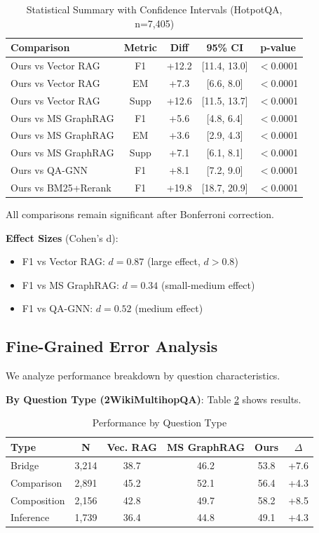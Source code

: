 \documentclass[conference]{IEEEtran}
\begin{document}
\begin{table}[htbp]
\caption{Statistical Summary with Confidence Intervals (HotpotQA, n=7,405)}
\label{tab:statistical}
\centering
\footnotesize
\begin{tabular}{lcccc}
\toprule
\textbf{Comparison} & \textbf{Metric} & \textbf{Diff} & \textbf{95\% CI} & \textbf{p-value} \\
\midrule
Ours vs Vector RAG & F1 & +12.2 & [11.4, 13.0] & $<$0.0001 \\
Ours vs Vector RAG & EM & +7.3 & [6.6, 8.0] & $<$0.0001 \\
Ours vs Vector RAG & Supp & +12.6 & [11.5, 13.7] & $<$0.0001 \\
Ours vs MS GraphRAG & F1 & +5.6 & [4.8, 6.4] & $<$0.0001 \\
Ours vs MS GraphRAG & EM & +3.6 & [2.9, 4.3] & $<$0.0001 \\
Ours vs MS GraphRAG & Supp & +7.1 & [6.1, 8.1] & $<$0.0001 \\
Ours vs QA-GNN & F1 & +8.1 & [7.2, 9.0] & $<$0.0001 \\
Ours vs BM25+Rerank & F1 & +19.8 & [18.7, 20.9] & $<$0.0001 \\
\bottomrule
\end{tabular}
\end{table}

All comparisons remain significant after Bonferroni correction.

\textbf{Effect Sizes} (Cohen's d):
\begin{itemize}
    \item F1 vs Vector RAG: $d = 0.87$ (large effect, $d > 0.8$)
    \item F1 vs MS GraphRAG: $d = 0.34$ (small-medium effect)
    \item F1 vs QA-GNN: $d = 0.52$ (medium effect)
\end{itemize}

\subsection{Fine-Grained Error Analysis}

We analyze performance breakdown by question characteristics.

\textbf{By Question Type (2WikiMultihopQA)}: Table \ref{tab:questiontype} shows results.

\begin{table}[htbp]
\caption{Performance by Question Type}
\label{tab:questiontype}
\centering
\begin{tabular}{lccccc}
\toprule
\textbf{Type} & \textbf{N} & \textbf{Vec. RAG} & \textbf{MS GraphRAG} & \textbf{Ours} & \textbf{$\Delta$} \\
\midrule
Bridge & 3,214 & 38.7 & 46.2 & 53.8 & +7.6 \\
Comparison & 2,891 & 45.2 & 52.1 & 56.4 & +4.3 \\
Composition & 2,156 & 42.8 & 49.7 & 58.2 & +8.5 \\
Inference & 1,739 & 36.4 & 44.8 & 49.1 & +4.3 \\
\bottomrule
\end{tabular}
\end{table}
\end{document}
